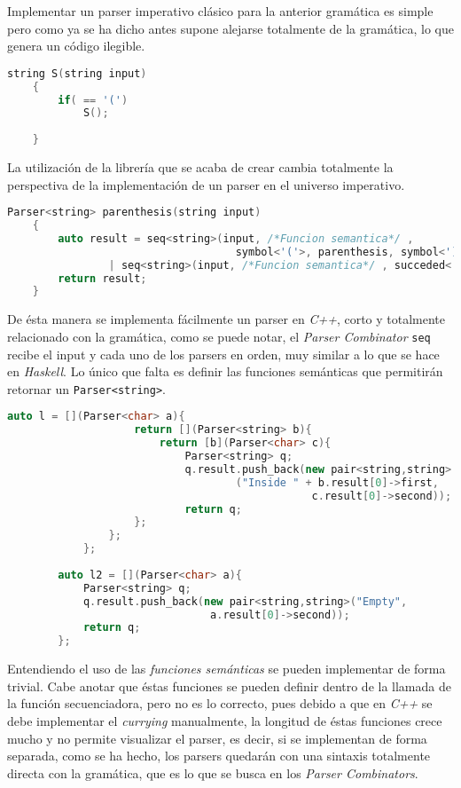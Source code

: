 	Implementar un parser imperativo clásico para la anterior gramática es simple pero como ya se ha dicho antes supone alejarse totalmente de la gramática, lo que genera un código ilegible.
	
	\begin{lstlisting}[language=C++, caption=Parser clásico en C++]
	string S(string input)
	{
		if( == '(')
			S();
		
	}		
	\end{lstlisting}
	
	La utilización de la librería que se acaba de crear cambia totalmente la perspectiva de la implementación de un parser en el universo imperativo.
	
	\begin{lstlisting}[language=C++, caption=utilización de los Parser combinators en C++]
	Parser<string> parenthesis(string input)
	{
		auto result = seq<string>(input, /*Funcion semantica*/ , 
									symbol<'('>, parenthesis, symbol<')'>) 
				| seq<string>(input, /*Funcion semantica*/ , succeded<'e'>);
		return result;
	}		
	\end{lstlisting}
	
	De ésta manera se implementa fácilmente un parser en \emph{C++}, corto y totalmente relacionado con la gramática, como se puede notar, el \emph{Parser Combinator} \texttt{seq} recibe el input y cada uno de los parsers en orden, muy similar a lo que se hace en \emph{Haskell}. Lo único que falta es definir las funciones semánticas que permitirán retornar un \texttt{Parser<string>}. 
	
	\begin{lstlisting}[language=C++, caption=Funciones semánticas en C++]
		auto l = [](Parser<char> a){
					return [](Parser<string> b){
						return [b](Parser<char> c){
							Parser<string> q;
							q.result.push_back(new pair<string,string>
									("Inside " + b.result[0]->first, 
												c.result[0]->second));
							return q;
					};
				};
			};
		
		auto l2 = [](Parser<char> a){
			Parser<string> q;
			q.result.push_back(new pair<string,string>("Empty", 
								a.result[0]->second));
			return q;
		};		
	\end{lstlisting}
	
	Entendiendo el uso de las \emph{funciones semánticas} se pueden implementar de forma trivial. Cabe anotar que éstas funciones se pueden definir dentro de la llamada de la función secuenciadora, pero no es lo correcto, pues debido a que en \emph{C++} se debe implementar el \emph{currying} manualmente, la longitud de éstas funciones crece mucho y no permite visualizar el parser, es decir, si se implementan de forma separada, como se ha hecho, los parsers quedarán con una sintaxis totalmente directa con la gramática, que es lo que se busca en los \emph{Parser Combinators}.
	
